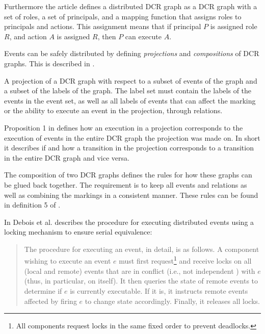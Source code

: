 	Furthermore the article defines a distributed DCR graph as a DCR graph with a set of roles, a set of principals, and a mapping function that assigns roles to principals and actions. This assignment means that if principal $P$ is assigned role $R$, and action $A$ is assigned $R$, then $P$ can execute $A$.
		
	\newpar
	Events can be safely distributed by defining \textit{projections} and \textit{compositions} of DCR graphs. This is described in \cite{hildebrandt2011safe}.
	
	\newpar
	A projection of a DCR graph with respect to a subset of events of the graph and a subset of the labels of the graph. The label set must contain the labels of the events in the event set, as well as all labels of events that can affect the marking or the ability to execute an event in the projection, through relations.
	
	\newpar
	Proposition 1 in \cite{hildebrandt2011safe} defines how an execution in a projection corresponds to the execution of events in the entire DCR graph the projection was made on. In short it describes if and how a transition in the projection corresponds to a transition in the entire DCR graph and vice versa.
	
	\newpar
	The composition of two DCR graphs defines the rules for how these graphs can be glued back together. The requirement is to keep all events and relations as well as combining the markings in a consistent manner. These rules can be found in definition 5 of \cite{hildebrandt2011safe}.
    
	\newpar 
	In \cite{debois2015concurrency} Debois et al. describes the procedure for executing distributed events using a locking mechanism to ensure serial equivalence:
	
	\begin{quotation}
		The procedure for executing an event, in detail, is as follows. A component
		wishing to execute an event $e$ must first request\footnote{All components request locks in the same fixed order to prevent deadlocks.} and receive locks on all (local
		and remote) events that are in conflict (i.e., not independent ) with $e$ (thus, in
		particular, on itself). It then queries the state of remote events to determine if
		$e$ is currently executable. If it is, it instructs remote events affected by firing $e$
		to change state accordingly. Finally, it releases all locks.
	\end{quotation}
	
